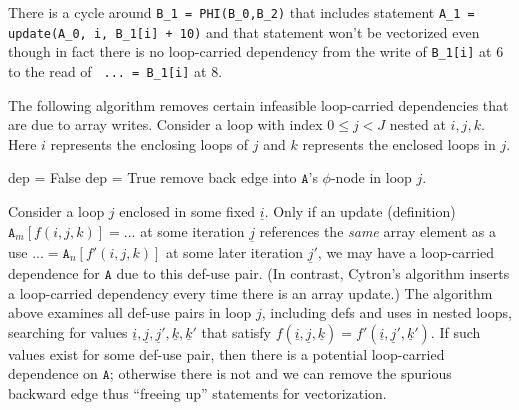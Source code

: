 \documentclass[sigconf, screen, natbib=false, dvipsnames, table]{acmart}
\theoremstyle{definition}
\begin{document}
There is a cycle around \texttt{B\_1 = PHI(B\_0,B\_2)} that includes statement 
\texttt{A\_1 = update(A\_0, i, B\_1[i] + 10)} and that statement won't be vectorized even 
though in fact there is no loop-carried dependency from the write of \texttt{B\_1[i]} at 6 to the
read of \texttt{ ... = B\_1[i]} at 8.

The following algorithm removes certain infeasible loop-carried dependencies that are due to array writes. Consider a loop with index $0 \le j < J$
nested at $i,j,k$. Here $i$ represents the enclosing loops of $j$ and $k$ represents the enclosed loops in $j$.

\begin{algorithmic}
\STATE {}
\STATE dep = False
\STATE dep = True
\ENDIF
\ENDFOR
{}
\STATE remove back edge into $\texttt{A}$'s $\phi$-node in loop $j$.
\ENDIF
\ENDFOR
\end{algorithmic}

Consider a loop $j$ enclosed in some fixed $\underline{i}$. Only if an update (definition) $\texttt{A}_m[f(i,j,k)] = ... $ at some iteration $\underline{j}$
references the \emph{same} array element as a use $ ... = \texttt{A}_n[f'(i,j,k)]$ at some later iteration $\underline{j}'$,
we may have a loop-carried dependence for $\texttt{A}$ due to this def-use pair. (In contrast, Cytron's algorithm inserts a loop-carried dependency every time there is an array update.)
The algorithm above examines all def-use pairs in loop $j$, including defs and uses in nested loops, searching for values $\underline{i}, \underline{j}, \underline{j}', \underline{k}, \underline{k}'$ that satisfy
$f(\underline{i},\underline{j},\underline{k}) = f'(\underline{i},\underline{j}',\underline{k}')$. If such values exist for some def-use pair, then there is a potential
loop-carried dependence on $\texttt{A}$; otherwise there is not and we can remove the spurious backward edge thus ``freeing up'' statements for vectorization. %
\end{document}
